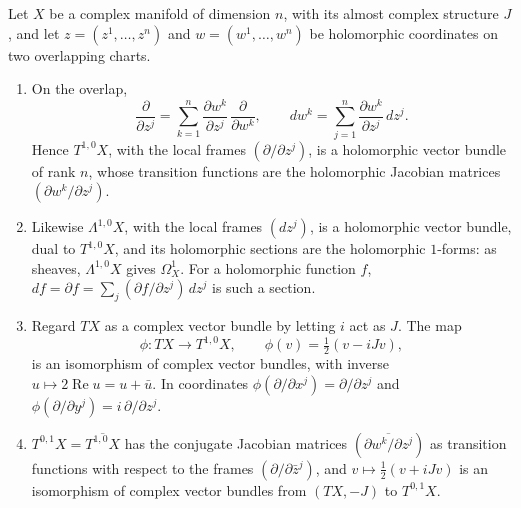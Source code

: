 \begin{proposition}\label{complex-manifolds:proposition-holomorphic-tangent}
Let $X$ be a complex manifold of dimension $n$, with its almost complex structure $J$, and let $z = (z^1, \ldots, z^n)$ and $w = (w^1, \ldots, w^n)$ be holomorphic coordinates on two overlapping charts.
\begin{enumerate}
\item On the overlap,
\[
\frac{\partial}{\partial z^j} = \sum_{k=1}^n\frac{\partial w^k}{\partial z^j}\,\frac{\partial}{\partial w^k}, \qquad dw^k = \sum_{j=1}^n\frac{\partial w^k}{\partial z^j}\,dz^j .
\]
Hence $T^{1,0}X$, with the local frames $(\partial/\partial z^j)$, is a holomorphic vector bundle of rank $n$, whose transition functions are the holomorphic Jacobian matrices $(\partial w^k/\partial z^j)$.
\item Likewise $\Lambda^{1,0}X$, with the local frames $(dz^j)$, is a holomorphic vector bundle, dual to $T^{1,0}X$, and its holomorphic sections are the holomorphic $1$-forms: as sheaves, $\Lambda^{1,0}X$ gives
$\Omega^1_X$. For a holomorphic function $f$, $df = \partial f = \sum_j(\partial f/\partial z^j)\,dz^j$ is such a section.
\item Regard $TX$ as a complex vector bundle by letting $i$ act as $J$. The map
\[
\phi \colon TX \to T^{1,0}X, \qquad \phi(v) = \tfrac12(v - iJv),
\]
is an isomorphism of complex vector bundles, with inverse $u \mapsto 2\operatorname{Re}u = u + \bar u$. In coordinates $\phi(\partial/\partial x^j) = \partial/\partial z^j$ and $\phi(\partial/\partial y^j) = i\,\partial/\partial z^j$.
\item $T^{0,1}X = \overline{T^{1,0}X}$ has the conjugate Jacobian matrices $(\overline{\partial w^k/\partial z^j})$ as transition functions with respect to the frames $(\partial/\partial\bar z^j)$, and $v \mapsto \frac12(v + iJv)$ is an
isomorphism of complex vector bundles from $(TX, -J)$ to $T^{0,1}X$.
\end{enumerate}
\end{proposition}

